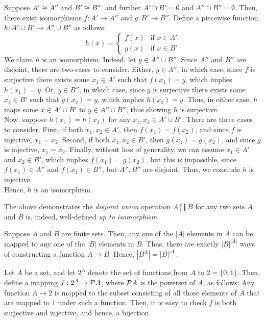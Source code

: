 \begin{xca}
Suppose $A' \cong A''$ and $B' \cong B''$, and further $A' \cap B' = \emptyset$
and $A'' \cap B'' = \emptyset$. Then, there exist isomorphisms $f: A' \to A''$
and $g: B' \to B''$. Define a piecewise function $h: A' \cup B' \to A'' \cup
 B''$ as follows:
\[
    h(x) =
    \begin{cases}
        f(x) & \text{if } x \in A' \\
        g(x) & \text{if } x \in B'
    \end{cases}
\]
We claim $h$ is an isomorphism. Indeed, let $y \in A'' \cup B''$. Since $A''$
and $B''$ are disjoint, there are two cases to consider. Either, $y \in A''$,
in which case, since $f$ is surjective there exists some $x_1 \in A'$ such that
$f(x_1) = y$, which implies $h(x_1) = y$. Or, $y \in B''$, in which case, since
$g$ is surjective there exists some $x_2 \in B'$ such that $g(x_2) = y$, which
implies $h(x_2) = y$. Thus, in either case, $h$ maps some $x \in A' \cup B'$ to
$y \in A'' \cup B''$, thus showing $h$ is surjective.\\
Now, suppose $h(x_1) = h(x_2)$ for any $x_1, x_2 \in A' \cup B'$. There are
three cases to consider. First, if both $x_1, x_2 \in A'$, then $f(x_1) =
f(x_2)$, and since $f$ is injective, $x_1 = x_2$. Second, if both $x_1, x_2 \in
B'$, then $g(x_1) = g(x_2)$, and since $g$ is injective, $x_1 = x_2$. Finally,
without loss of generality, we can assume $x_1 \in A'$ and $x_2 \in B'$, which
implies $f(x_1) = g(x_2)$, but this is impossible, since $f(x_1) \in A''$ and
$f(x_2) \in B''$, but $A'', B''$ are disjoint. Thus, we conclude $h$ is
injective.\\
Hence, $h$ is an isomorphism.

The above demonstrates the \emph{disjoint union} operation $A \amalg B$ for any
two sets $A$ and $B$ is, indeed, well-defined \emph{up to isomorphism}.
\end{xca}

\begin{xca}
Suppose $A$ and $B$ are finite sets. Then, any one of the $|A|$ elements in $A$
can be mapped to any one of the $|B|$ elements in $B$. Thus, there are
exactly $|B|^{|A|}$ ways of constructing a function $A \to B$. Hence, $|B^A| =
|B|^{|A|}$.
\end{xca}

\begin{xca}
Let $A$ be a set, and let $2^A$ denote the set of functions from $A$ to $2 = \{
0, 1\}$. Then, define a mapping $f: 2^A \to \mathcal{P}A$, where $\mathcal{P}A$ is the
powerset of $A$, as follows: Any function $A \to 2$ is mapped to the subset
consisting of all those elements of $A$ that are mapped to $1$ under such a
function. Then, it is easy to check $f$ is both surjective and injective, and
hence, a bijection.
\end{xca}

